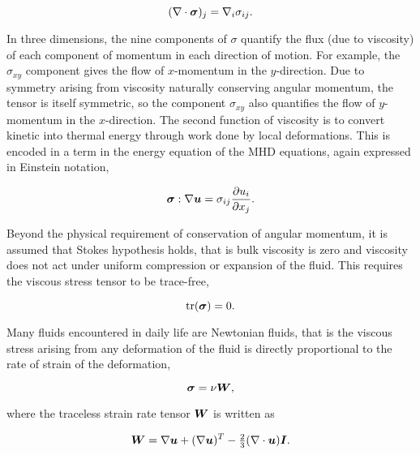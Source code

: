 \begin{equation}
  \label{eq:viscous_momenum_transport}
  (\nabla \cdot {\bm \sigma})_j = \nabla_i \sigma_{ij}.
\end{equation}

In three dimensions, the nine components of $\sigma$ quantify the flux (due to viscosity) of each component of momentum in each direction of motion. For example, the $\sigma_{xy}$ component gives the flow of $x$-momentum in the $y$-direction. Due to symmetry arising from viscosity naturally conserving angular momentum, the tensor is itself symmetric, so the component $\sigma_{xy}$ also quantifies the flow of $y$-momentum in the $x$-direction. The second function of viscosity is to convert kinetic into thermal energy through work done by local deformations. This is encoded in a term in the energy equation of the MHD equations, again expressed in Einstein notation,

\begin{equation}
  \label{eq:viscous_heat_generation}
  {\bm \sigma} : \nabla {\bm u} = \sigma_{ij} \frac{\partial u_i}{\partial x_j}.
\end{equation}

Beyond the physical requirement of conservation of angular momentum, it is assumed that Stokes hypothesis holds, that is bulk viscosity is zero and viscosity does not act under uniform compression or expansion of the fluid. This requires the viscous stress tensor to be trace-free,

\begin{equation}
  \label{eq:trace_free_tensor}
  \text{tr}({\bm \sigma}) = 0.
\end{equation}

Many fluids encountered in daily life are Newtonian fluids, that is the viscous stress arising from any deformation of the fluid is directly proportional to the rate of strain of the deformation,

\begin{equation}
  \label{eq:isotropic_viscous_tensor}
  {\bm \sigma} = \nu {\bm W},
\end{equation}

where the traceless strain rate tensor ${\bm W}$ is written as

\begin{equation}
  \label{eq:rate_of_strain}
  {\bm W} = \nabla{\bm u} + (\nabla{\bm u})^T - \tfrac{2}{3}(\nabla \cdot {\bm u}){\bm I}.
\end{equation}

